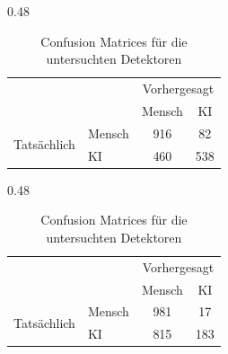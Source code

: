 \begin{table}[htbp]
  \centering
  \caption{Confusion Matrices für die untersuchten Detektoren}
  \label{tab:haupttabelle_vorexperiment1}
  \begin{subtable}[t]{0.48\textwidth}
    \centering
    \begin{tabular}{ll cc}
      \toprule
                                   &        & \multicolumn{2}{c}{Vorhergesagt}       \\
                                   &        & Mensch                           & KI  \\
      \midrule
      \multirow{2}{*}{Tatsächlich} & Mensch & 916                              & 82  \\
                                   & KI     & 460                              & 538 \\
      \bottomrule
    \end{tabular}
    \label{tab:cm-roberta-base-openai-detector}
  \end{subtable}
  \hfill
  \begin{subtable}[t]{0.48\textwidth}
    \centering
    \begin{tabular}{ll cc}
      \toprule
                                   &        & \multicolumn{2}{c}{Vorhergesagt}       \\
                                   &        & Mensch                           & KI  \\
      \midrule
      \multirow{2}{*}{Tatsächlich} & Mensch & 981                              & 17  \\
                                   & KI     & 815                              & 183 \\
      \bottomrule
    \end{tabular}
    \label{tab:cm-chatgpt-detector-roberta}
  \end{subtable}

  \vspace{0.5cm} %


\end{table}
